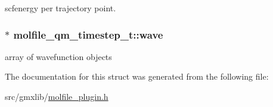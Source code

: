scfenergy per trajectory point. \hypertarget{structmolfile__qm__timestep__t_a7ad01de8fe8ca9ec91774685f35effdc}{
\subsubsection[{wave}]{$\ast$ {\bf molfile\-\_\-qm\-\_\-timestep\-\_\-t\-::wave}}}\label{structmolfile__qm__timestep__t_a7ad01de8fe8ca9ec91774685f35effdc}
array of wavefunction objects 

\-The documentation for this struct was generated from the following file\-:\begin{DoxyCompactItemize}
\item 
src/gmxlib/\hyperlink{molfile__plugin_8h}{molfile\-\_\-plugin.\-h}\end{DoxyCompactItemize}
